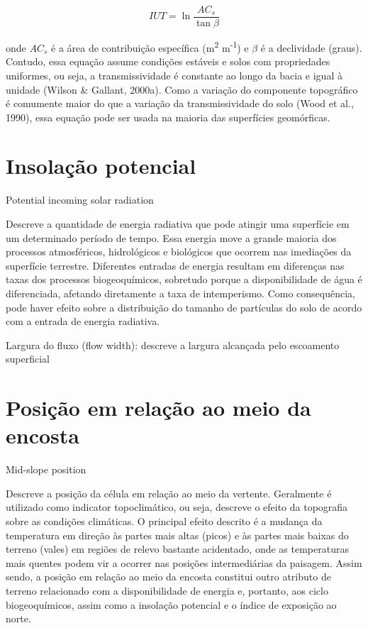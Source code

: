 \documentclass[]{book}
\begin{document}
\[IUT = \ln \frac{AC_s}{\tan{\beta}}\]

onde \(AC_s\) é a área de contribuição específica (m\textsuperscript{2}
m\textsuperscript{-1}) e \(\beta\) é a declividade (graus). Contudo,
essa equação assume condições estáveis e solos com propriedades
uniformes, ou seja, a transmissividade é constante ao longo da bacia e
igual à unidade (Wilson \& Gallant, 2000a). Como a variação do
componente topográfico é comumente maior do que a variação da
transmissividade do solo (Wood et al., 1990), essa equação pode ser
usada na maioria das superfícies geomórficas.

\section{Insolação potencial}\label{insolacao-potencial}

Potential incoming solar radiation

Descreve a quantidade de energia radiativa que pode atingir uma
superfície em um determinado período de tempo. Essa energia move a
grande maioria dos processos atmosféricos, hidrológicos e biológicos que
ocorrem nas imediações da superfície terrestre. Diferentes entradas de
energia resultam em diferenças nas taxas dos processos biogeoquímicos,
sobretudo porque a disponibilidade de água é diferenciada, afetando
diretamente a taxa de intemperismo. Como consequência, pode haver efeito
sobre a distribuição do tamanho de partículas do solo de acordo com a
entrada de energia radiativa.

Largura do ﬂuxo (ﬂow width): descreve a largura alcançada pelo
escoamento superﬁcial

\section{Posição em relação ao meio da
encosta}\label{posicao-em-relacao-ao-meio-da-encosta}

Mid-slope position

Descreve a posição da célula em relação ao meio da vertente. Geralmente
é utilizado como indicator topoclimático, ou seja, descreve o efeito da
topografia sobre as condições climáticas. O principal efeito descrito é
a mudança da temperatura em direção às partes mais altas (picos) e às
partes mais baixas do terreno (vales) em regiões de relevo bastante
acidentado, onde as temperaturas mais quentes podem vir a ocorrer nas
posições intermediárias da paisagem. Assim sendo, a posição em relação
ao meio da encosta constitui outro atributo de terreno relacionado com a
disponibilidade de energia e, portanto, aos ciclo biogeoquímicos, assim
como a insolação potencial e o índice de exposição ao norte.
\end{document}
